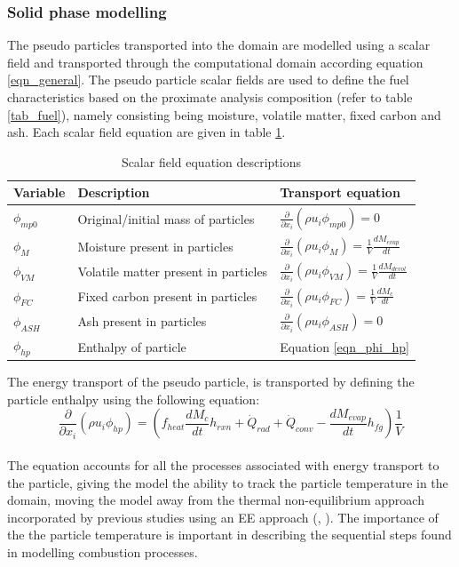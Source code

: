 \documentclass{webofc}
\begin{document}
\subsubsection{Solid phase modelling}
The pseudo particles transported into the domain are modelled using a scalar field and transported through the computational domain according equation \ref{eqn_general}. The pseudo particle scalar fields are used to define the fuel characteristics based on the proximate analysis composition (refer to table \ref{tab_fuel}), namely consisting being moisture, volatile matter, fixed  carbon and ash. Each scalar field equation are given in table \ref{tab_scalars}.\\

\begin{table}[h!]
\centering
\caption{Scalar field equation descriptions}\label{tab_scalars}       
\begin{tabular}{lll}
\hline
Variable &Description& Transport equation \\
\hline
$\phi_{mp0}$ &Original/initial mass of particles& $\frac{\partial}{\partial x_{i}}(\rho u_{i} \phi_{mp0})=0$\\
$\phi_{M}$&Moisture present in particles&$\frac{\partial}{\partial x_{i}}(\rho u_{i} \phi_{M})=\frac{1}{V} \frac{dM_{evap}}{dt}$\\
$\phi_{VM}$&Volatile matter present in particles&  $\frac{\partial}{\partial x_{i}}(\rho u_{i} \phi_{VM})=\frac{1}{V}\frac{dM_{devol}}{dt}$\\
$\phi_{FC}$&Fixed carbon present in particles&$\frac{\partial}{\partial x_{i}}(\rho u_{i} \phi_{FC})=\frac{1}{V}\frac{dM_c}{dt}$\\
$\phi_{ASH}$&Ash present in particles&$\frac{\partial}{\partial x_{i}}(\rho u_{i} \phi_{ASH})=0$\\
$\phi_{hp}$&Enthalpy of particle&Equation \ref{eqn_phi_hp}\\
\hline
\end{tabular}
\end{table}

The energy transport of the pseudo particle, is transported by defining the particle enthalpy using the following equation:
\begin{equation}\label{eqn_phi_hp}
\frac{\partial}{\partial x_{i}}(\rho u_{i} \phi_{hp})=\left(f_{heat}\frac{dM_{c}}{dt}h_{rxn} + \dot{Q}_{rad} + \dot{Q}_{conv} - \frac{dM_{evap}}{dt}h_{fg}\right)\frac{1}{V}
\end{equation}
\\
The equation accounts for all the processes associated with energy transport to the particle, giving the model the ability to track the particle temperature in the domain, moving the model away from the thermal non-equilibrium approach incorporated by previous studies using an EE approach (\cite{epple}, \cite{knaus}). The importance of the the particle temperature is important in describing the sequential steps found in modelling combustion processes.
\end{document}
